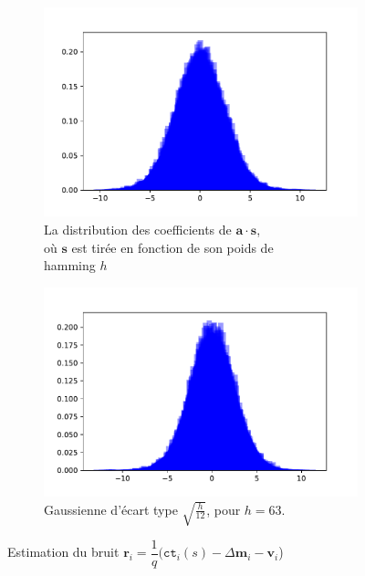 \documentclass[11pt, headsepline, a4paper, fleqn, oneside]{article}
\begin{document}
\begin{figure}[ht]
  \centering
  \begin{subfigure}[t]{2.5in}
  \centering
    \includegraphics[width=\linewidth]{prod.pdf}
    \caption{\footnotesize{La distribution des coefficients de $\boldsymbol{a}\cdot\boldsymbol{s}$,\\où $\boldsymbol{s}$ est tirée en fonction de son poids de\\ hamming $h$}}
  \end{subfigure}
  \begin{subfigure}[t]{2.5in}
  \centering
    \includegraphics[width=\linewidth]{ham.pdf}
    \caption{\footnotesize{Gaussienne d'écart type $\sqrt{\frac{h}{12}}$, pour $h=63$.}}
  \end{subfigure}
 \caption{\footnotesize Estimation du bruit $\boldsymbol{r}_i =\dfrac{1}{q}(\texttt{ct}_i (s) - \Delta\boldsymbol{m}_i - \boldsymbol{v}_i$)}
\label{fig:6}
\end{figure}
\end{document}
